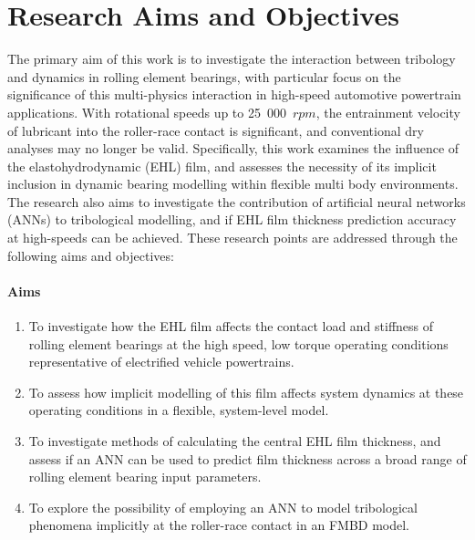 \section{Research Aims and Objectives} \label{Research Questions}

The primary aim of this work is to investigate the interaction between tribology and dynamics in rolling element bearings, with particular focus on the significance of this multi-physics interaction in high-speed automotive powertrain applications. With rotational speeds up to 25~000~$rpm$, the entrainment velocity of lubricant into the roller-race contact is significant, and conventional dry analyses may no longer be valid. Specifically, this work examines the influence of the elastohydrodynamic (EHL) film, and assesses the necessity of its implicit inclusion in dynamic bearing modelling within flexible multi body environments. The research also aims to investigate the contribution of artificial neural networks (ANNs) to tribological modelling, and if EHL film thickness prediction accuracy at high-speeds can be achieved. These research points are addressed through the following aims and objectives:

\paragraph{Aims}
\begin{enumerate}
	\item To investigate how the EHL film affects the contact load and stiffness of rolling element bearings at the high speed, low torque operating conditions representative of electrified vehicle powertrains. 
	\item To assess how implicit modelling of this film affects system dynamics at these operating conditions in a flexible, system-level model.
	\item To investigate methods of calculating the central EHL film thickness, and assess if an ANN can be used to predict film thickness across a broad range of rolling element bearing input parameters.
	\item To explore the possibility of employing an ANN to model tribological phenomena implicitly at the roller-race contact in an FMBD model. 
\end{enumerate}

